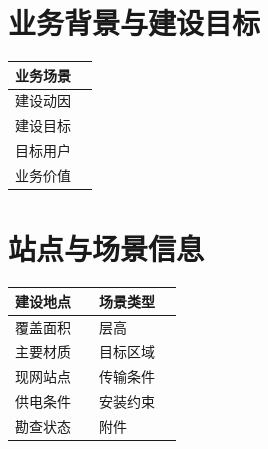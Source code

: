 \documentclass[12pt,a4paper]{ctexart}
\begin{document}
\section{业务背景与建设目标}

\begin{tabularx}{\textwidth}{|P{3.2cm}|Y|}
\hline
业务场景 & %
 \\ \hline
建设动因 & %
 \\ \hline
建设目标 & %
 \\ \hline
目标用户 & %
 \\ \hline
业务价值 & %
 \\ \hline
\end{tabularx}

\section{站点与场景信息}

\begin{tabularx}{\textwidth}{|P{3.2cm}|Y|P{3.2cm}|Y|}
\hline
建设地点 & %
 & 场景类型 & %
 \\ \hline
覆盖面积 & %
 & 层高 & %
 \\ \hline
主要材质 & %
 & 目标区域 & %
 \\ \hline
现网站点 & %
 & 传输条件 & %
 \\ \hline
供电条件 & %
 & 安装约束 & %
 \\ \hline
勘查状态 & %
 & 附件 & %
 \\ \hline
\end{tabularx}
\end{document}

